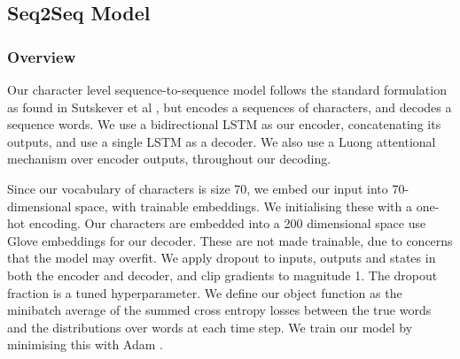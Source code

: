 








\subsection{Seq2Seq Model} %
\label{sec:character_level_sequence_to_sequence}

\subsubsection{Overview}

Our character level sequence-to-sequence model follows the standard formulation as found in Sutskever et al \cite{sutskever_sequence_2014} \cite{bahdanau_neural_2014}, but encodes a sequences of characters, and decodes a sequence words. 
We use a bidirectional LSTM as our encoder, concatenating its outputs\cite{bahdanau_neural_2014}, and use a single LSTM as a decoder.
We also use a Luong attentional mechanism \cite{luong_effective_2015} over encoder outputs, throughout our decoding.

Since our vocabulary of characters is size 70, we embed our input into 70-dimensional space, with trainable embeddings. We initialising these with a one-hot encoding.
Our characters are embedded into a 200 dimensional space use Glove embeddings for our decoder. 
These are not made trainable, due to concerns that the model may overfit. 
We apply dropout \cite{srivastava_dropout_nodate} to inputs, outputs and states in both the encoder and decoder, and clip gradients to magnitude 1. The dropout fraction is a tuned hyperparameter.
We define our object function as the minibatch average of the summed cross entropy losses between the true words and the distributions over words at each time step.
We train our model by minimising this with Adam \cite{kingma2014adam}. 

